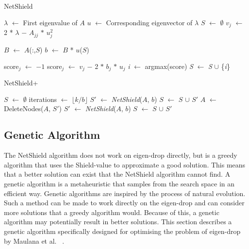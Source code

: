 \documentclass[11pt]{article}
\theoremstyle{definition}
\newcommand*\Let[2]{\State #1 $\gets$ #2}
\begin{document}
\begin{algorithm}
  \caption{NetShield
    \label{alg:netshield}}
  \begin{algorithmic}[1]
    
    \Statex
    \Let{$\lambda$}{First eigenvalue of $A$}
    \Let{$u$}{Corresponding eigenvector of $\lambda$}
    \Let{$S$}{$\emptyset$}
        \Let{$v_j$}{2 * $\lambda$ $-$ $A_{jj}$ $*$ $u_j^2$}
    \EndFor
    
        \Let{$B$}{$A$(:,$S$)}
        \Let{$b$}{$B$ * $u$($S$) }
        
            \Let{score$_j$}{$-1$}
        \Else
            \Let{score$_j$}{$v_j$ $-$ 2 $*$ $b_j$ $*$ $u_j$}
        \EndIf
        \EndFor
        \Let{\textit{i}}{argmax(score)}
        \Let{\textit{S}}{\textit{S} $\cup$ \{\textit{i}\}}
    \EndFor
    \State {}
  \end{algorithmic}
\end{algorithm}


\begin{algorithm}
  \caption{NetShield+
    \label{alg:netshield_plus}}
  \begin{algorithmic}[1]
    
    \Statex
    \Let{$S$}{$\emptyset$}
    \Let{iterations}{$\lfloor k/b \rfloor$}
        \Let{$S'$}{\textit{NetShield}($A$, $b$)}
        \Let{$S$}{$S$ $\cup$ $S'$}
        \Let{$A$}{DeleteNodes($A$, $S'$)}
    \EndFor
        \Let{$S'$}{\textit{NetShield}($A$, $b$)}
        \Let{$S$}{$S$ $\cup$ $S'$}
    \EndIf
    \State {}
  \end{algorithmic}
\end{algorithm}

\subsection{Genetic Algorithm}

The NetShield algorithm does not work on eigen-drop directly, but is a greedy algorithm that uses the Shield-value to approximate a good solution. This means that a better solution can exist that the NetShield algorithm cannot find. A genetic algorithm is a metaheuristic that samples from the search space in an efficient way. Genetic algorithms are inspired by the process of natural evolution. Such a method can be made to work directly on the eigen-drop and can consider more solutions that a greedy algorithm would. Because of this, a genetic algorithm may potentially result in better solutions. This section describes a genetic algorithm specifically designed for optimising the problem of eigen-drop by Maulana et al. ~\cite{maulana2017immunization}.
\end{document}
